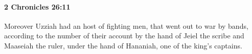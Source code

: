 
		\paragraph{2 Chronicles 26:11} %
			\label{2CHRONICLES-26-11}

			Moreover Uzziah had an host of fighting men, that went out to war by bands, according to the number of their account by the hand of Jeiel the scribe and Maaseiah the ruler, under the hand of Hananiah, one of the king's captains.


